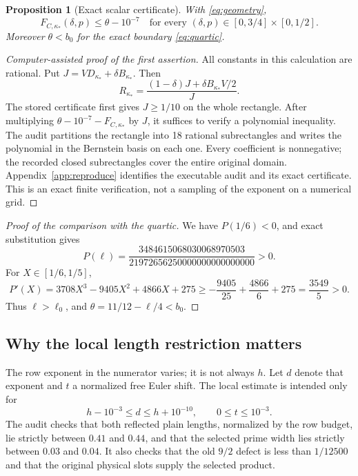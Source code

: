 \documentclass[11pt]{article}
\newtheorem{proposition}{Proposition}[section]
\theoremstyle{definition}
\begin{document}
\begin{proposition}[Exact scalar certificate]\label{prop:certificate}
With \eqref{eq:geometry},
\[
 F_{C,\kappa_*}(\delta,p)\le\theta-10^{-7}
 \quad\text{for every }(\delta,p)\in[0,3/4]\times[0,1/2].
\]
Moreover $\theta<b_0$ for the exact boundary \eqref{eq:quartic}.
\end{proposition}
\begin{proof}[Computer-assisted proof of the first assertion]
All constants in this calculation are rational. Put
$J=VD_{\kappa_*}+\delta B_{\kappa_*}$. Then
\[
 R_{\kappa_*}=\frac{(1-\delta)J+\delta B_{\kappa_*}V/2}{J}.
\]
The stored certificate first gives $J\ge1/10$ on the whole rectangle.
After multiplying $\theta-10^{-7}-F_{C,\kappa_*}$ by $J$, it suffices
to verify a polynomial inequality. The audit partitions the rectangle
into 18 rational subrectangles and writes the polynomial in the
Bernstein basis on each one. Every coefficient is nonnegative; the
recorded closed subrectangles cover the entire original domain.
Appendix~\ref{app:reproduce} identifies the executable audit and its
exact certificate. This is an exact finite verification, not a sampling
of the exponent on a numerical grid.
\end{proof}
\begin{proof}[Proof of the comparison with the quartic]
We have $P(1/6)<0$, and exact substitution gives
\[
 P(\ell)=\frac{3484615068030068970503}
                    {21972656250000000000000000}>0.
\]
For $X\in[1/6,1/5]$,
\[
 P'(X)=3708X^3-9405X^2+4866X+275
 \ge-\frac{9405}{25}+\frac{4866}{6}+275
 =\frac{3549}{5}>0.
\]
Thus $\ell>\ell_0$, and $\theta=11/12-\ell/4<b_0$.
\end{proof}

\subsection{Why the local length restriction matters}
The row exponent in the numerator varies; it is not always $h$.
Let $d$ denote that exponent and $t$ a normalized free Euler shift.
The local estimate is intended only for
\begin{equation}\label{eq:applicationwindow}
 h-10^{-3}\le d\le h+10^{-10},\qquad 0\le t\le10^{-3}.
\end{equation}
The audit checks that both reflected plain lengths, normalized by the
row budget, lie strictly between $0.41$ and $0.44$, and that the selected
prime width lies strictly between $0.03$ and $0.04$. It also checks
that the old $9/2$ defect is less than $1/12500$ and that the original
physical slots supply the selected product.
\end{document}
